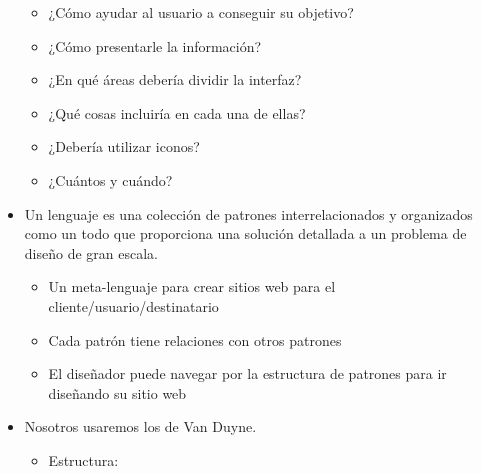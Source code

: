 \documentclass[12pt, twoside, openright]{report} %
\begin{document}
\begin{itemize}
        \begin{itemize}
        
        \item
          ¿Cómo ayudar al usuario a conseguir su objetivo?
        \item
          ¿Cómo presentarle la información?
        \item
          ¿En qué áreas debería dividir la interfaz?
        \item
          ¿Qué cosas incluiría en cada una de ellas?
        \item
          ¿Debería utilizar iconos?
        \item
          ¿Cuántos y cuándo?
        \end{itemize}
      \item
        Un lenguaje es una colección de patrones interrelacionados y
        organizados como un todo que proporciona una solución detallada
        a un problema de diseño de gran escala.

        \begin{itemize}
        
        \item
          Un meta-lenguaje para crear sitios web para el
          cliente/usuario/destinatario
        \item
          Cada patrón tiene relaciones con otros patrones
        \item
          El diseñador puede navegar por la estructura de patrones para
          ir diseñando su sitio web
        \end{itemize}
      \item
        Nosotros usaremos los de Van Duyne.

        \begin{itemize}
        \item
          Estructura:

          \begin{itemize}
          

\end{itemize}
\end{itemize}
\end{itemize}
\end{document}
